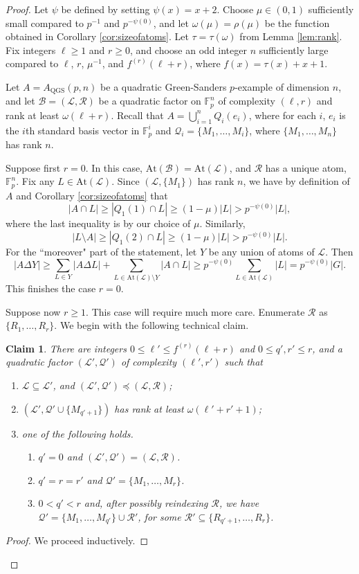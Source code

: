 \documentclass[12pt,oneside,british,a4wide]{amsart}
\newtheorem{claim}[theorem]{Claim}
\numberwithin{equation}{section}
\theoremstyle{definition}
\def\F{\mathbb{F}}
\def\QGS{\mathrm{QGS}}
\newcommand{\calL}{\mathcal{L}}
\newcommand{\calB}{\mathcal{B}}
\newcommand{\calQ}{\mathcal{Q}}
\newcommand{\calR}{\mathcal{R}}
\newcommand{\At}{{\mathrm{At}}}
\begin{document}
\begin{proof}
Let $\psi$ be defined by setting $\psi(x)=x+2$.  Choose $\mu\in (0,1)$ sufficiently small compared to $p^{-1}$ and $p^{-\psi(0)}$, and let  $\omega(\mu)=\rho(\mu)$ be the function obtained in Corollary \ref{cor:sizeofatoms}.  Let $\tau=\tau(\omega)$ from Lemma \ref{lem:rank}. Fix integers $\ell\geq 1$ and $r\geq 0$, and choose an odd integer $n$ sufficiently large compared to $ \ell$, $r$, $\mu^{-1}$, and $f^{(r)}(\ell+r)$, where $f(x)=\tau(x)+x+1$. 

 Let $A=A_{\QGS}(p,n)$ be a quadratic Green-Sanders $p$-example of dimension $n$, and let $\calB=(\calL,\calR)$ be a quadratic factor on $\F_p^n$ of complexity $(\ell,r)$ and rank at least $\omega(\ell+r)$. Recall that $A=\bigcup_{i=1}^nQ_i(e_i)$, where for each $i$, $e_i$ is the $i$th standard basis vector in $\F_p^i$ and $\calQ_i=\{M_1,\ldots, M_i\}$, where $\{M_1,\ldots, M_n\}$ has rank $n$.  
 
Suppose first $r=0$. In this case, $\At(\calB)=\At(\calL)$, and $\calR$ has a unique atom, $\F_p^n$.  Fix any $L\in \At(\calL)$.  Since $(\calL,\{M_1\})$ has rank $n$, we have by definition of $A$ and Corollary \ref{cor:sizeofatoms} that
$$
|A\cap L|\geq |Q_1(1)\cap L|\geq (1-\mu)|L|>p^{-\psi(0)}|L|,
$$
where the last inequality is by our choice of $\mu$.  Similarly, 
$$
|L\setminus A|\geq |Q_1(2)\cap L|\geq (1-\mu)|L|>p^{-\psi(0)}|L|.
$$
For the ``moreover" part of the statement, let $Y$ be any union of atoms of $\calL$.  Then 
$$
|A\Delta Y|\geq \sum_{L\in Y}|A\Delta L|+\sum_{L\in \At(\calL)\setminus Y}|A\cap L|\geq p^{-\psi(0)}\sum_{L\in \At(\calL)}|L|=p^{-\psi(0)}|G|.
$$
This finishes the case $r=0$.
 
 Suppose now $r\geq 1$. This case will require much more care.   Enumerate $\calR$ as $\{R_1,\ldots, R_r\}$.  We begin with the following technical claim.

\begin{claim}\label{cl:gsbad}
There are integers $0\leq \ell'\leq f^{(r)}(\ell+r)$ and $0\leq q',r'\leq r$, and a quadratic factor $(\calL',\calQ')$ of complexity $(\ell',r')$ such that
\begin{enumerate}[label=\normalfont(\roman*)]
\item $\calL\subseteq \calL'$, and $(\calL',\calQ')\preceq (\calL,\calR)$;
\item  $(\calL',\calQ'\cup \{M_{q'+1}\})$ has rank at least $\omega(\ell'+r'+1)$;
\item one of the following holds.\label{cases1}
\begin{enumerate}
\item $q'=0$ and $(\calL',\calQ')=(\calL,\calR)$. \label{cases1a}
\item $q'=r=r'$ and $\calQ'=\{M_1,\ldots, M_r\}$.\label{cases1b}
\item $0<q'<r$ and,  after possibly reindexing $\calR$, we have $\calQ'=\{M_1,\ldots, M_{q'}\}\cup \calR'$, for some $\calR'\subseteq \{R_{q'+1},\ldots, R_r\}$.\label{cases1c}
\end{enumerate}
\end{enumerate}
\end{claim}
\begin{proof}
We proceed inductively. 


\end{proof}
\end{proof}
\end{document}
